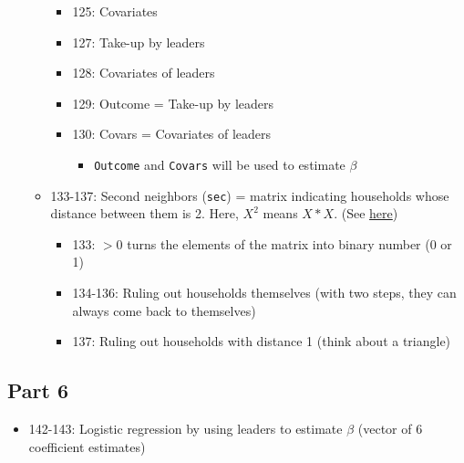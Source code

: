 \documentclass[10pt,letterpaper]{article}
\begin{document}
\begin{itemize}
\begin{itemize}
\begin{itemize}
          \item 125: Covariates
          \item 127: Take-up by leaders
          \item 128: Covariates of leaders
          \item 129: Outcome = Take-up by leaders
          \item 130: Covars = Covariates of leaders
            \begin{itemize}
              \item \texttt{Outcome} and \texttt{Covars} will be used to estimate $\beta$
            \end{itemize}
        \end{itemize}
      \item 133-137: Second neighbors (\texttt{sec}) = matrix indicating households whose distance between them is 2.
        Here, $X^2$ means $X * X$.
        (See \href{https://en.wikipedia.org/wiki/Adjacency_matrix#Matrix_powers}{here})
        \begin{itemize}
          \item 133: $>0$ turns the elements of the matrix into binary number (0 or 1)
          \item 134-136: Ruling out households themselves (with two steps, they can always come back to themselves)
          \item 137: Ruling out households with distance 1 (think about a triangle)
        \end{itemize}
    \end{itemize}
\end{itemize}

\subsection*{Part 6}
\begin{itemize}
  \item 142-143: Logistic regression by using leaders to estimate $\beta$ (vector of 6 coefficient estimates)
\end{itemize}
\end{document}

